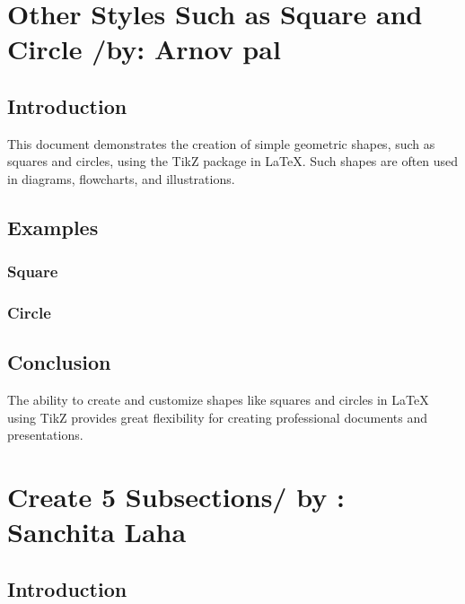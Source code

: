 \documentclass[12pt,a4paper]{article}
\begin{document}
	\section{Other Styles Such as Square and Circle /by: Arnov pal}
	\subsection{Introduction}
	This document demonstrates the creation of simple geometric shapes, such as squares and circles, using the TikZ package in LaTeX. Such shapes are often used in diagrams, flowcharts, and illustrations.
	
	\subsection{Examples}
	\subsubsection{Square}
	\begin{center}
	\end{center}
	
	\subsubsection{Circle}
	\begin{center}
	\end{center}
	
	\subsection{Conclusion}
	The ability to create and customize shapes like squares and circles in LaTeX using TikZ provides great flexibility for creating professional documents and presentations.
	\newpage
	\section{Create 5 Subsections/ by : Sanchita Laha}
	\subsection{Introduction}
	
\end{document}
